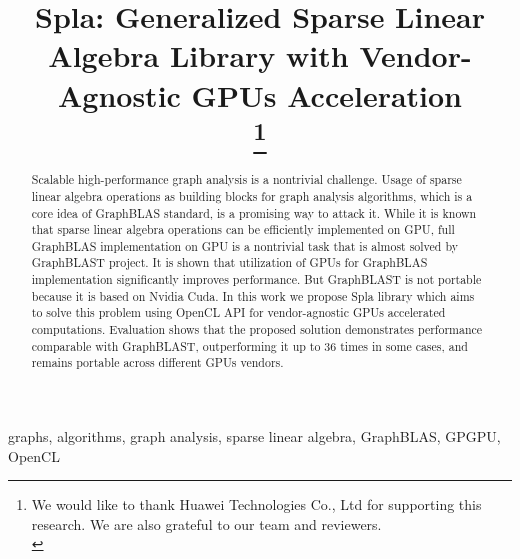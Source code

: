 \documentclass[conference]{IEEEtran}
\begin{document}
\title{Spla: Generalized Sparse Linear Algebra Library with Vendor-Agnostic GPUs Acceleration\\
\thanks{We would like to thank Huawei Technologies Co., Ltd for supporting this research. We are also grateful to our team and reviewers.\\}}

\author{
\and
{}
}

\maketitle

\begin{abstract}
    Scalable high-performance graph analysis is a nontrivial challenge. 
    Usage of sparse linear algebra operations as building blocks for graph analysis algorithms, which is a core idea of GraphBLAS standard, is a promising way to attack it.
    While it is known that sparse linear algebra operations can be efficiently implemented on GPU, full GraphBLAS implementation on GPU is a nontrivial task that is almost solved by GraphBLAST project. 
    It is shown that utilization of GPUs for GraphBLAS implementation significantly improves performance. But GraphBLAST is not portable because it is based on Nvidia Cuda.
    In this work we propose Spla library which aims to solve this problem using OpenCL API for vendor-agnostic GPUs accelerated computations.
    Evaluation shows that the proposed solution demonstrates performance comparable with GraphBLAST, outperforming it up to 36 times in some cases, and remains portable across different GPUs vendors.
\end{abstract}

\begin{IEEEkeywords}
graphs, algorithms, graph analysis, sparse linear algebra, GraphBLAS, GPGPU, OpenCL
\end{IEEEkeywords}








\end{document}
